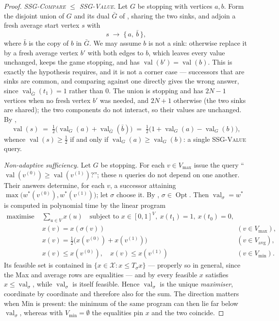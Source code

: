 \documentclass[11pt]{article}
\theoremstyle{plain}
\theoremstyle{definition}
\DeclareMathOperator{\val}{val}
\DeclareMathOperator{\Opt}{Opt}
\newcommand{\Vmax}{V_{\max}}
\newcommand{\Vmin}{V_{\min}}
\newcommand{\Vavg}{V_{\mathrm{avg}}}
\begin{document}
\begin{proof}
\emph{\textsc{SSG-Compare} $\le$ \textsc{SSG-Value}.} Let $G$ be stopping
with vertices $a,b$. Form the disjoint union of $G$ and its dual
$\bar G$ of , sharing the two sinks, and adjoin a fresh
average start vertex $s$ with
\[
  s\;\to\;\{\,a,\ \bar b\,\},
\]
where $\bar b$ is the copy of $b$ in $\bar G$. We may assume $b$ is not a
sink: otherwise replace it by a fresh average vertex $b'$ with both edges
to $b$, which leaves every value unchanged, keeps the game stopping, and
has $\val(b')=\val(b)$. This is exactly the hypothesis
 requires, and it is not a corner case --- successors
that are sinks are common, and comparing against one directly gives the
wrong answer, since $\val_{\bar G}(t_1)=1$ rather than $0$. The union is
stopping and has $2N-1$ vertices when no fresh vertex $b'$ was needed, and
$2N+1$ otherwise (the two sinks are shared); the two components do not interact, so their values
are unchanged. By ,
\[
  \val(s)\;=\;\tfrac12\bigl(\val_G(a)+\val_{\bar G}(\bar b)\bigr)
  \;=\;\tfrac12\bigl(1+\val_G(a)-\val_G(b)\bigr),
\]
whence $\val(s)\ge\tfrac12$ if and only if $\val_G(a)\ge\val_G(b)$: a
single \textsc{SSG-Value} query.

\emph{Non-adaptive sufficiency.} Let $G$ be stopping. For each
$v\in\Vmax$ issue the query ``$\val(v^{(0)})\ge\val(v^{(1)})$?''; these
$n$ queries do not depend on one another. Their answers determine, for
each $v$, a successor attaining
$\max\bigl(w^\ast(v^{(0)}),w^\ast(v^{(1)})\bigr)$; let $\sigma$ choose it.
By , $\sigma\in\Opt$. Then $\val_\sigma=w^\ast$ is
computed in polynomial time by the linear program
\begin{equation}\label{eq:lp}
\begin{aligned}
  \text{maximise } &\textstyle\sum_{u\in V} x(u)\quad\text{subject to } x\in[0,1]^V,\ x(t_1)=1,\ x(t_0)=0,\\
  &x(v)=x(\sigma(v)) && (v\in\Vmax),\\
  &x(v)=\tfrac12\bigl(x(v^{(0)})+x(v^{(1)})\bigr) && (v\in\Vavg),\\
  &x(v)\le x(v^{(0)}),\quad x(v)\le x(v^{(1)}) && (v\in\Vmin).
\end{aligned}
\end{equation}
Its feasible set is contained in $\{x\in\mathcal{X}:x\le T_\sigma x\}$
--- properly so in general, since the Max and average rows are equalities
--- and by  every feasible $x$ satisfies
$x\le\val_\sigma$, while $\val_\sigma$ is itself feasible. Hence
$\val_\sigma$ is the unique \emph{maximiser}, coordinate by coordinate and
therefore also for the sum. The direction matters when Min is present:
the minimum of the same program can then lie far below $\val_\sigma$,
whereas with $\Vmin=\emptyset$ the equalities pin $x$ and the two
coincide.
\end{proof}
\end{document}
